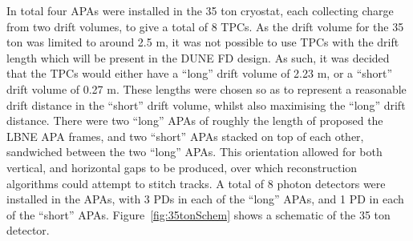 In total four APAs were installed in the 35 ton cryostat, each collecting charge from two drift volumes, to give a total of 8 TPCs. As the drift volume for the 35 ton was limited to around 2.5 m, it was not possible to use TPCs with the drift length which will be present in the DUNE FD design. As such, it was decided that the TPCs would either have a ``long'' drift volume of 2.23 m, or a ``short'' drift volume of 0.27 m. These lengths were chosen so as to represent a reasonable drift distance in the ``short'' drift volume, whilst also maximising the ``long'' drift distance. There were two ``long'' APAs of roughly the length of proposed the LBNE APA frames, and two ``short'' APAs stacked on top of each other, sandwiched between the two ``long'' APAs. This orientation allowed for both vertical, and horizontal gaps to be produced, over which reconstruction algorithms could attempt to stitch tracks. A total of 8 photon detectors were installed in the APAs, with 3 PDs in each of the ``long'' APAs, and 1 PD in each of the ``short'' APAs. Figure~\ref{fig:35tonSchem} shows a schematic of the 35 ton detector. \\

